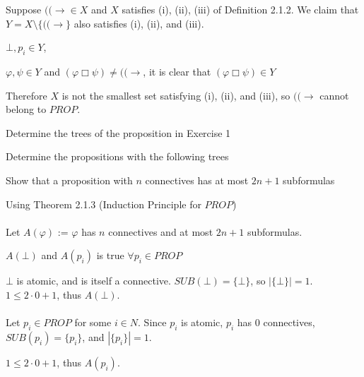 \documentclass{article}
\begin{document}
\noindent Suppose $(( \to \in X$ and $X$ satisfies (i), (ii), (iii) of Definition 2.1.2. We claim that $Y = X\text{\textbackslash} \{ ((\to \}$ also satisfies (i), (ii), and (iii). 
\begin{description*}
\item[\hspace{2em}(i)] $\bot, p_i \in Y$, 
\item[\hspace{2em}(ii)] $\varphi , \psi \in Y$ and $(\varphi \Box \psi) \neq ((\to $, it is clear that $(\varphi \Box \psi) \in Y $
\item[\hspace{2em}(iii)]
\end{description*}
Therefore $X$ is not the smallest set satisfying (i), (ii), and (iii), so $((\to $ cannot belong to $PROP$.

\begin{description*}
	\item[7. (a)] Determine the trees of the proposition in Exercise 1
	\item[\hspace{1.2em}(b)] Determine the propositions with the following trees
\end{description*}

\begin{description*}
	\item[9.] Show that a proposition with $n$ connectives has at most $2n + 1$ subformulas
\end{description*}
Using Theorem 2.1.3 (Induction Principle for $PROP$) \\ \\
Let $A(\varphi)$ := $\varphi$ has $n$ connectives and at most $2n + 1$ subformulas.

\begin{description*}
\item[\hspace{2em}(i)] $A(\bot)$ and $A(p_i)$ is true $\forall p_i \in PROP$ 
\end{description*}
\hspace{5em}$\bot$ is atomic, and is itself a connective. $SUB(\bot)=\{\bot\}$, so $|\{\bot\}| = 1$. $1 \leq 2 \cdot 0 + 1$, thus $A(\bot)$.
\\\\
Let $p_i \in PROP$ for some $i \in N$. Since $p_i$ is atomic, $p_i$ has $0$ connectives, $SUB(p_i) = \{p_i\}$, and  $|\{p_i\}| = 1$.\\
\begin{center}
$ 1 \leq 2 \cdot 0 + 1$, thus $A(p_i)$.
\end{center}
\end{document}
